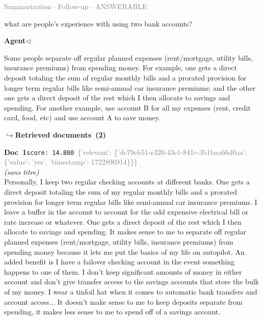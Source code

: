 \documentclass[a4paper,11pt]{article}
\begin{document}
\hfill{\tiny\textcolor{gray}{Summarization $\cdot$ Follow-up $\cdot$ ANSWERABLE}}
\begin{userbubble}
what are people's experience with using two bank accounts?
\end{userbubble}
\noindent\hfill{\small\textcolor{agentcolor}{\textbf{Agent\enspace$\triangleleft$}}}
\begin{agentbubble}
Some people separate off regular planned expenses (rent/mortgage, utility bills, insurance premiums) from spending money. For example, one gets a direct deposit totaling the sum of regular monthly bills and a prorated provision for longer term regular bills like semi-annual car insurance premiums; and the other one gets a direct deposit of the rest which I then allocate to savings and spending. For another example, use account B for all my expenses (rent, credit card, food, etc) and use account A to save money.
\end{agentbubble}
\noindent\hfill{\footnotesize\textcolor{doccolor}{\textbf{$\hookrightarrow$\enspace Retrieved documents~(2)}}}
\begin{docenv}
{\footnotesize\textcolor{doccolor}{\textbf{Doc~1}}}\hfill{\tiny\texttt{score:~14.880}}\ {\tiny\textcolor{gray}{\{'relevant': \{'dc79eb51-e320-43c1-841c-3b1baa66d0aa': \{'value': 'yes', 'timestamp': 1722896914\}\}\}}}\\[3pt]
{\small\textit{(sans titre)}}\\[2pt]
\vspace{2pt}
{\footnotesize 
Personally, I keep two regular checking accounts at different banks.  One gets a direct deposit totaling the sum of my regular monthly bills and a prorated provision for longer term regular bills like semi-annual car insurance premiums.  I leave a buffer in the account to account for the odd expensive electrical bill or rate increase or whatever.  One gets a direct deposit of the rest which I then allocate to savings and spending. It makes sense to me to separate off regular planned expenses (rent/mortgage, utility bills, insurance premiums) from spending money because it lets me put the basics of my life on autopilot.  An added benefit is I have a failover checking account in the event something happens to one of them.  I don't keep significant amounts of money in either account and don't give transfer access to the savings accounts that store the bulk of my money.  I wear a tinfoil hat when it comes to automatic bank transfers and account access... It doesn't make sense to me to keep deposits separate from spending, it makes less sense to me to spend off of a savings account.}
\end{docenv}
\end{document}
